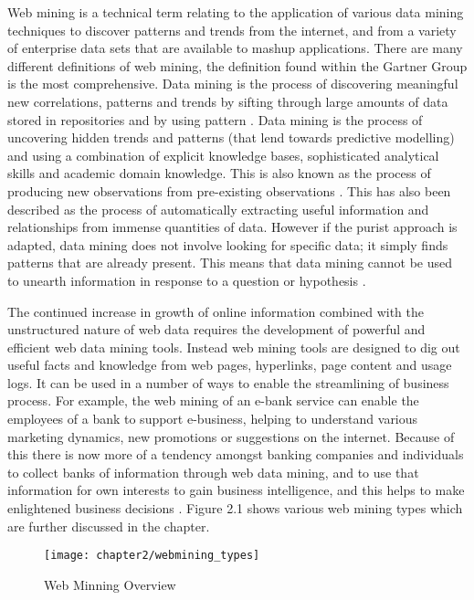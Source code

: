 Web mining is a technical term relating to the application of various data mining techniques to discover patterns and trends from the internet, and from a variety of enterprise data sets that are available to mashup applications. There are many different definitions of web mining, the definition found within the Gartner Group is the most comprehensive. Data mining is the process of discovering meaningful new correlations, patterns and trends by sifting through large amounts of data stored in repositories and by using pattern \cite{larose2014discovering}. Data mining is the process of uncovering hidden trends and patterns (that lend towards predictive modelling) and using a combination of explicit knowledge bases, sophisticated analytical skills and academic domain knowledge. This is also known as the process of producing new observations from pre-existing observations \cite{raju2014data}. This has also been described as the process of automatically extracting useful information and relationships from immense quantities of data. However if the purist approach is adapted, data mining does not involve looking for specific data; it simply finds patterns that are already present. This means that data mining cannot be used to unearth information in response to a question or hypothesis \cite{larose2014discovering}.

The continued increase in growth of online information combined with the unstructured nature of web data requires the development of powerful and efficient web data mining tools. Instead web mining tools are designed to dig out useful facts and knowledge from web pages, hyperlinks, page content and usage logs. It can be used in a number of ways to enable the streamlining of business process. For example, the web mining of an e-bank service can enable the employees of a bank to support e-business, helping to understand various marketing dynamics, new promotions or suggestions on the internet. Because of this there is now more of a tendency amongst banking companies and individuals to collect banks of information through web data mining, and to use that information for own interests to gain business intelligence, and this helps to make enlightened business decisions \cite{raju2014data}. Figure 2.1 shows various web mining types which are further discussed in the chapter.

\begin{figure}[H]
\centering
\texttt{[image: chapter2/webmining\_types]}
\caption{Web Minning Overview}
\end{figure}

